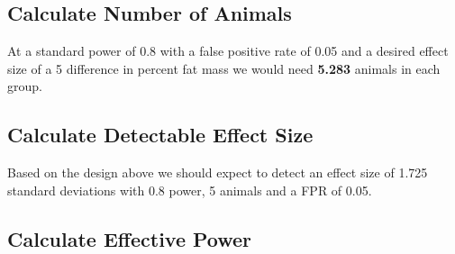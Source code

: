 \documentclass[]{article}
\newenvironment{Shaded}{\begin{snugshade}}{\end{snugshade}}
\newcommand{\KeywordTok}[1]{\textcolor[rgb]{0.13,0.29,0.53}{\textbf{#1}}}
\newcommand{\DataTypeTok}[1]{\textcolor[rgb]{0.13,0.29,0.53}{#1}}
\newcommand{\StringTok}[1]{\textcolor[rgb]{0.31,0.60,0.02}{#1}}
\newcommand{\OperatorTok}[1]{\textcolor[rgb]{0.81,0.36,0.00}{\textbf{#1}}}
\newcommand{\NormalTok}[1]{#1}
\begin{document}
\subsection{Calculate Number of
Animals}\label{calculate-number-of-animals}

At a standard power of 0.8 with a false positive rate of 0.05 and a
desired effect size of a 5 difference in percent fat mass we would need
\textbf{5.283} animals in each group.

\subsection{Calculate Detectable Effect
Size}\label{calculate-detectable-effect-size}

\begin{Shaded}
\end{Shaded}

Based on the design above we should expect to detect an effect size of
1.725 standard deviations with 0.8 power, 5 animals and a FPR of 0.05.

\subsection{Calculate Effective Power}\label{calculate-effective-power}

\begin{Shaded}
\end{Shaded}
\end{document}
